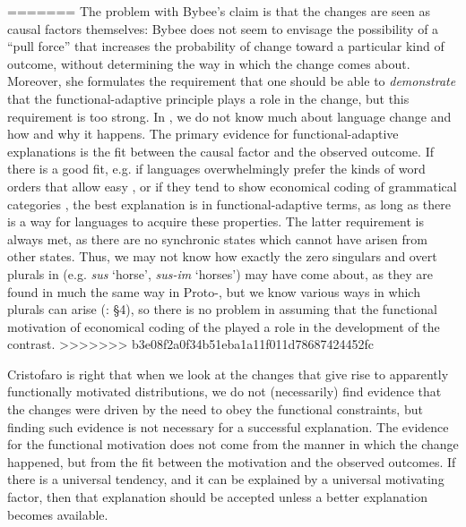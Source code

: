 \documentclass[output=paper]{langsci/langscibook}
\begin{document}
=======
The problem with Bybee’s claim is that the changes are seen as causal factors themselves: Bybee does not seem to envisage the possibility of a “pull force” that increases the probability of change toward a particular kind of outcome, without determining the way in which the change comes about. Moreover, she formulates the requirement that one should be able to \textit{demonstrate} that the functional-adaptive principle plays a role in the change, but this requirement is too strong. In , we do not know much about language change and how and why it happens. The primary evidence for functional-adaptive explanations is the fit between the causal factor and the observed outcome. If there is a good fit, e.g. if languages overwhelmingly prefer the kinds of word orders that allow easy  \citep{Hawkins2014_VarEff}, or if they tend to show economical coding of grammatical categories \citep{Haspelmath2008_FreqIcon}, the best explanation is in functional-adaptive terms, as long as there is a way for languages to acquire these properties. The latter requirement is always met, as there are no synchronic states which cannot have arisen from other states. Thus, we may not know how exactly the zero singulars and overt plurals in  (e.g. \textit{sus} ‘horse’, \textit{sus-im} ‘horses’) may have come about, as they are found in much the same way in Proto-, but we know various ways in which plurals can arise (\citealt{Cristofaro2013}: §4), so there is no problem in assuming that the functional motivation of economical coding of the  played a role in the development of the contrast.
>>>>>>> b3e08f2a0f34b51eba1a11f011d78687424452fc

Cristofaro\label{Haspelmathchapterpageref} is right that when we look at the changes that give rise to apparently functionally motivated distributions, we do not (necessarily) find evidence that the changes were driven by the need to obey the functional constraints, but finding such evidence is not necessary for a successful explanation.
The evidence for the functional motivation does not come from the manner in which the change happened, but from the fit between the motivation and the observed outcomes. If there is a universal tendency, and it can be explained by a universal motivating factor, then that explanation should be accepted unless a better explanation becomes available.
\end{document}
